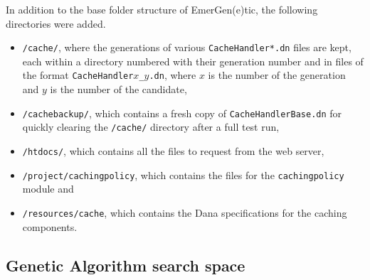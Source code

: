 \documentclass[compsoc,12pt,a4paper]{IEEEtran}
\begin{document}
			In addition to the base folder structure of EmerGen(e)tic, the following directories were added.
			\begin{itemize}
				\item \lstinline|/cache/|, where the generations of various \lstinline|CacheHandler*.dn| files are kept, each within a directory numbered with their generation number and in files of the format \lstinline|CacheHandler|$x$\lstinline|_|$y$\lstinline|.dn|, where $x$ is the number of the generation and $y$ is the number of the candidate,
				\item \lstinline|/cachebackup/|, which contains a fresh copy of \lstinline|CacheHandlerBase.dn| for quickly clearing the \lstinline|/cache/| directory after a full test run,
				\item \lstinline|/htdocs/|, which contains all the files to request from the web server,
				\item \lstinline|/project/cachingpolicy|, which contains the files for the \lstinline|cachingpolicy| module and
				\item \lstinline|/resources/cache|, which contains the Dana specifications for the caching components.
			\end{itemize}
			
		\subsection{Genetic Algorithm search space}
		
\end{document}
